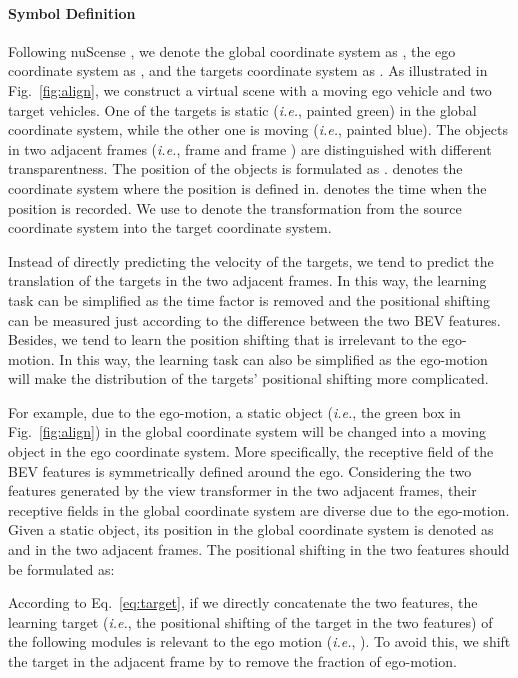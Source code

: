 \documentclass[10pt,twocolumn,letterpaper]{article}
\begin{document}
\paragraph{Symbol Definition} Following nuScense \cite{NS}, we denote the global coordinate system as , the ego coordinate system as , and the targets coordinate system as . As illustrated in Fig.~\ref{fig:align}, we construct a virtual scene with a moving ego vehicle and two target vehicles. One of the targets is static (\textit{i.e.},  painted green) in the global coordinate system, while the other one is moving (\textit{i.e.},  painted blue). The objects in two adjacent frames (\textit{i.e.}, frame  and frame ) are distinguished with different transparentness. The position of the objects is formulated as .  denotes the coordinate system where the position is defined in.  denotes the time when the position is recorded. We use  to denote the transformation from the source coordinate system into the target coordinate system.

Instead of directly predicting the velocity of the targets, we tend to predict the translation of the targets in the two adjacent frames. In this way, the learning task can be simplified as the time factor is removed and the positional shifting can be measured just according to the difference between the two BEV features. Besides, we tend to learn the position shifting that is irrelevant to the ego-motion. In this way, the learning task can also be simplified as the ego-motion will make the distribution of the targets' positional shifting more complicated.

For example, due to the ego-motion, a static object (\textit{i.e.}, the green box in Fig.~\ref{fig:align}) in the global coordinate system will be changed into a moving object in the ego coordinate system. More specifically, the receptive field of the BEV features is symmetrically defined around the ego. Considering the two features generated by the view transformer in the two adjacent frames, their receptive fields in the global coordinate system are diverse due to the ego-motion. Given a static object, its position in the global coordinate system is denoted as  and  in the two adjacent frames. The positional shifting in the two features should be formulated as:

According to Eq.~\ref{eq:target}, if we directly concatenate the two features, the learning target (\textit{i.e.}, the positional shifting of the target in the two features) of the following modules is relevant to the ego motion (\textit{i.e.}, ). To avoid this, we shift the target in the adjacent frame by  to remove the fraction of ego-motion.
\end{document}
